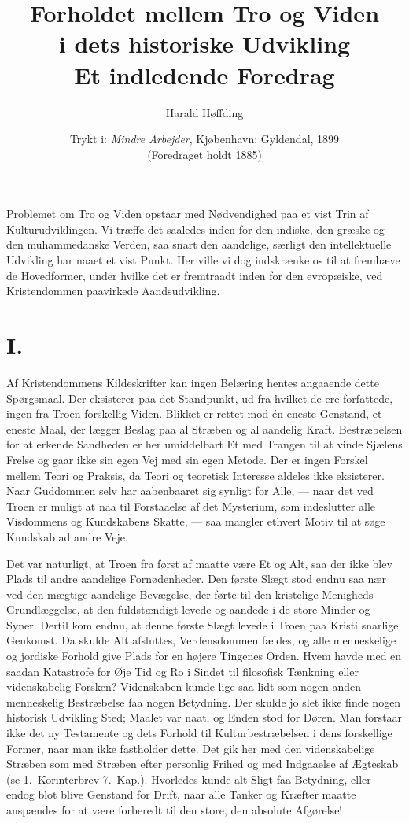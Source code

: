 \documentclass[12pt,a4paper]{article}
\title{\textbf{Forholdet mellem Tro og Viden\\[4pt]
       i dets historiske Udvikling}\\[6pt]
  \large Et indledende Foredrag}
\author{Harald Høffding}
\date{Trykt i: \emph{Mindre Arbejder}, Kjøbenhavn: Gyldendal, 1899\\
  (Foredraget holdt 1885)}
\newcommand{\apage}[1]{\marginnote{\footnotesize\textit{[#1]}}}
\begin{document}
\maketitle
\thispagestyle{fancy} \apage{195}

\bigskip

\noindent Problemet om Tro og Viden opstaar med Nødvendighed paa et vist
Trin af Kulturudviklingen. Vi træffe det saaledes inden for den indiske,
den græske og den muhammedanske Verden, saa snart den aandelige, særligt
den intellektuelle Udvikling har naaet et vist Punkt. Her ville vi dog
indskrænke os til at fremhæve de Hovedformer, under hvilke det er
fremtraadt inden for den evropæiske, ved Kristendommen paavirkede
Aandsudvikling.

\section*{I.}

Af Kristendommens Kildeskrifter kan ingen Belæring hentes angaaende dette
Spørgsmaal. Der eksisterer paa det Standpunkt, ud fra hvilket de ere
forfattede, ingen fra Troen forskellig Viden. Blikket er rettet mod én
eneste Genstand, et eneste Maal, der lægger Beslag paa al Stræben og al
aandelig Kraft. Bestræbelsen for at erkende Sandheden er her umiddelbart
Et med Trangen til at vinde Sjælens Frelse og gaar ikke sin egen Vej med
sin egen Metode. Der er ingen Forskel mellem Teori og Praksis, da Teori og
teoretisk Interesse aldeles ikke eksisterer. Naar Guddommen selv har
aabenbaaret sig synligt for Alle, --- naar det ved Troen er muligt at naa
til Forstaaelse af det \apage{196} Mysterium, som indeslutter alle Visdommens og
Kundskabens Skatte, --- saa mangler ethvert Motiv til at søge Kundskab ad
andre Veje.

Det var naturligt, at Troen fra først af maatte være Et og Alt, saa der
ikke blev Plads til andre aandelige Fornødenheder. Den første Slægt stod
endnu saa nær ved den mægtige aandelige Bevægelse, der førte til den
kristelige Menigheds Grundlæggelse, at den fuldstændigt levede og aandede
i de store Minder og Syner. Dertil kom endnu, at denne første Slægt levede
i Troen paa Kristi snarlige Genkomst. Da skulde Alt afsluttes,
Verdensdommen fældes, og alle menneskelige og jordiske Forhold give Plads
for en højere Tingenes Orden. Hvem havde med en saadan Katastrofe for Øje
Tid og Ro i Sindet til filosofisk Tænkning eller videnskabelig Forsken?
Videnskaben kunde lige saa lidt som nogen anden menneskelig Bestræbelse faa
nogen Betydning. Der skulde jo slet ikke finde nogen historisk Udvikling
Sted; Maalet var naat, og Enden stod for Døren. Man forstaar ikke det ny
Testamente og dets Forhold til Kulturbestræbelsen i dens forskellige
Former, naar man ikke fastholder dette. Det gik her med den videnskabelige
Stræben som med Stræben efter personlig Frihed og med Indgaaelse af
Ægteskab (se 1.\ Korinterbrev 7.\ Kap.). Hvorledes kunde alt Sligt faa
Betydning, eller endog blot blive Genstand for Drift, naar alle Tanker og
Kræfter maatte anspændes for at være forberedt til den store, den absolute
Afgørelse!
\end{document}
